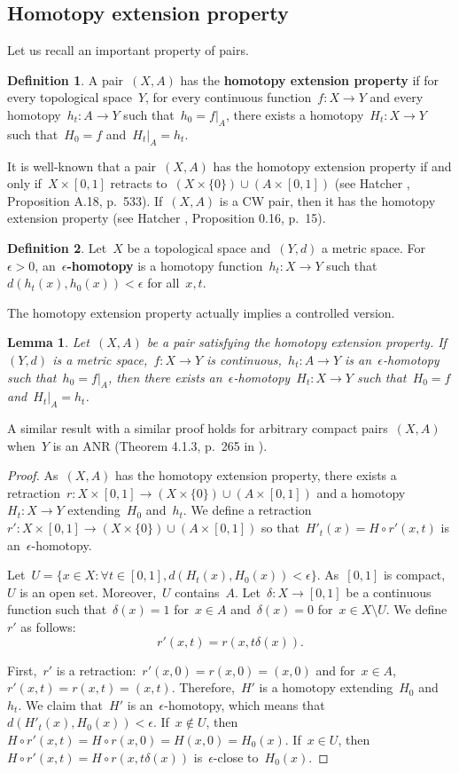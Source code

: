 \documentclass[english,11pt]{article}
\theoremstyle{plain}
\newtheorem{lemma}{Lemma}[section]
\theoremstyle{remark}
\theoremstyle{definition}
\newtheorem{definition}{Definition}[section]
\begin{document}
\subsection{Homotopy extension property}
Let us recall an important property of pairs.
\begin{definition}
A pair~$(X,A)$ has the \textbf{homotopy extension property} if for every topological space~$Y$, for every continuous function~$f:X\to Y$ and every homotopy~$h_t:A\to Y$ such that~$h_0=f|_A$, there exists a homotopy~$H_t:X\to Y$ such that~$H_0=f$ and~$H_t|_A=h_t$.
\end{definition}
It is well-known that a pair~$(X,A)$ has the homotopy extension property if and only if~$X\times [0,1]$ retracts to~$(X\times\{0\})\cup (A\times [0,1])$ (see Hatcher \cite{Hatcher02}, Proposition A.18, p.~533). If~$(X,A)$ is a CW pair, then it has the homotopy extension property (see Hatcher \cite{Hatcher02}, Proposition 0.16, p.~15).
\begin{definition}
Let~$X$ be a topological space and~$(Y,d)$ a metric space. For~$\epsilon>0$, an~$\epsilon$\textbf{-homotopy} is a homotopy function~$h_t:X\to Y$ such that~$d(h_t(x),h_0(x))<\epsilon$ for all~$x,t$.
\end{definition}

The homotopy extension property actually implies a controlled version.
\begin{lemma}\label{lem_controlled_hep}
Let~$(X,A)$ be a pair satisfying the homotopy extension property. If~$(Y,d)$ is a metric space,~$f:X\to Y$ is continuous,~$h_t:A\to Y$ is an~$\epsilon$-homotopy such that~$h_0=f|_A$, then there exists an~$\epsilon$-homotopy~$H_t:X\to Y$ such that~$H_0=f$ and~$H_t|_A=h_t$.
\end{lemma}
A similar result with a similar proof holds for arbitrary compact pairs~$(X,A)$ when~$Y$ is an ANR (Theorem 4.1.3, p.~265 in \cite{Mill01}).
\begin{proof}
As~$(X,A)$ has the homotopy extension property, there exists a retraction~$r:X\times [0,1]\to (X\times \{0\})\cup (A\times [0,1])$ and a homotopy~$H_t:X\to Y$ extending~$H_0$ and~$h_t$. We define a retraction~$r':X\times [0,1]\to (X\times \{0\})\cup (A\times [0,1])$ so that~$H'_t(x)=H\circ r'(x,t)$ is an~$\epsilon$-homotopy.

Let~$U=\{x\in X:\forall t\in[0,1],d(H_t(x),H_0(x))<\epsilon\}$. As~$[0,1]$ is compact,~$U$ is an open set. Moreover,~$U$ contains~$A$. Let~$\delta:X\to [0,1]$ be a continuous function such that~$\delta(x)=1$ for~$x\in A$ and~$\delta(x)=0$ for~$x\in X\setminus U$. We define~$r'$ as follows:
\begin{equation*}
r'(x,t)=r(x,t\delta(x)).
\end{equation*}

First,~$r'$ is a retraction:~$r'(x,0)=r(x,0)=(x,0)$ and for~$x\in A$,~$r'(x,t)=r(x,t)=(x,t)$. Therefore,~$H'$ is a homotopy extending~$H_0$ and~$h_t$. We claim that~$H'$ is an~$\epsilon$-homotopy, which means that~$d(H'_t(x),H_0(x))<\epsilon$. If~$x\notin U$, then~$H\circ r'(x,t)=H\circ r(x,0)=H(x,0)=H_0(x)$. If~$x\in U$, then~$H\circ r'(x,t)=H\circ r(x,t\delta(x))$ is~$\epsilon$-close to~$H_0(x)$.
\end{proof}
\end{document}
